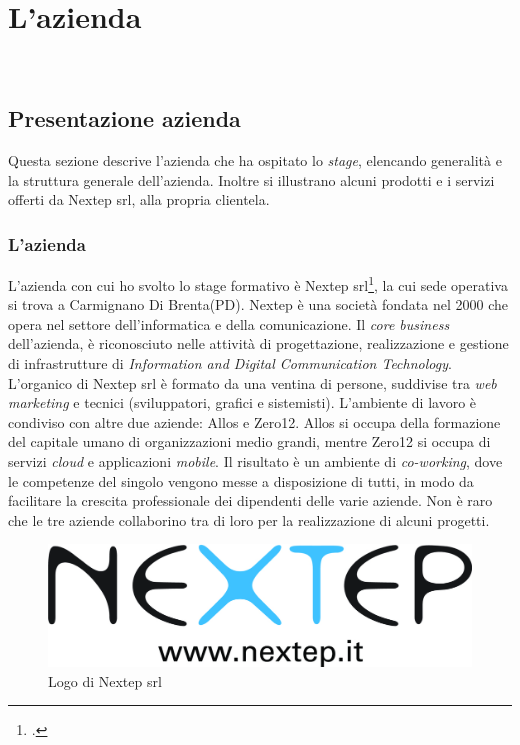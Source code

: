 
\chapter{L'azienda}
\label{cap:azienda}
\\




\section{Presentazione azienda}
Questa sezione descrive l'azienda che ha ospitato lo \emph{stage}, elencando generalità e la struttura generale dell'azienda. Inoltre si illustrano alcuni prodotti e i servizi offerti da Nextep srl, alla propria clientela.

\subsection{L'azienda}
L'azienda con cui ho svolto lo stage formativo è Nextep srl\footcite{http://www.nextep.it/}, la cui sede operativa si trova a Carmignano Di Brenta(PD). Nextep è una società fondata nel 2000 che opera nel settore dell'informatica e della comunicazione. Il \emph{core business} dell'azienda, è riconosciuto nelle attività di progettazione, realizzazione e gestione di infrastrutture di \emph{Information and Digital Communication Technology}. L'organico di Nextep srl è formato da una ventina di persone, suddivise tra \emph{web marketing} e tecnici (sviluppatori, grafici e sistemisti). L'ambiente di lavoro è condiviso con altre due aziende: Allos  e Zero12. Allos si occupa della formazione del capitale umano di organizzazioni medio grandi, mentre Zero12  si occupa di servizi \emph{cloud} e applicazioni \emph{mobile}. Il risultato è un ambiente di \emph{co-working}, dove le competenze del singolo vengono messe a disposizione di tutti, in modo da facilitare la crescita professionale dei dipendenti delle varie aziende. Non è raro che le tre aziende collaborino tra di loro per la realizzazione di alcuni progetti.
\begin{figure}[h]
\centering
\includegraphics[scale=0.20]{immagini/logo_nextep}
\caption{Logo di Nextep srl}
\label{fig:logo_nextep}
\end{figure}

